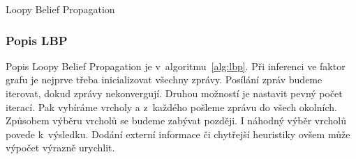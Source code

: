 \begin{algorithm}
\caption{Loopy Belief Propagation}
\label{alg:lbp}
\begin{algorithmic}
\State

\Repeat
            \Else
            \EndIf
        \EndFor
    \EndFor
{}

\EndFor
\EndFunction

\State

\State

    \EndFor
\EndFor
\EndFunction

\State

\State

\EndFunction

\State

\State

\EndFunction
\end{algorithmic}
\end{algorithm}

\subsubsection{Popis LBP}

Popis Loopy Belief Propagation je v~algoritmu~\ref{alg:lbp}.
Při inferenci ve faktor grafu je nejprve třeba inicializovat všechny zprávy.
Posílání zpráv budeme iterovat, dokud zprávy nekonvergují.
Druhou možností je nastavit pevný počet iterací.
Pak vybíráme vrcholy a z~každého pošleme zprávu do všech okolních.
Způsobem výběru vrcholů se budeme zabývat později.
I náhodný výběr vrcholů povede k~výsledku.
Dodání externí informace či chytřejší heuristiky ovšem může výpočet výrazně urychlit.

